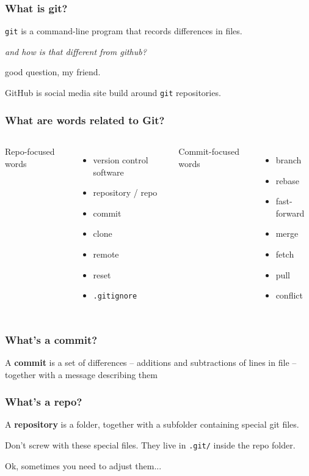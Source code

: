 \documentclass[14pt,aspectratio=1610]{beamer} %
\newcommand{\fframe}[2]{
   \begin{frame}
\frametitle{#1}
#2
\end{frame}
}
\begin{document}
\fframe{What is git?}
{
\begin{definition}
	{\tt git} is a command-line program that records differences in files.
\end{definition}
\vspace{\baselineskip}

	{\em and how is that different from github?}

\vspace{\baselineskip}
	good question, my friend.  
	\begin{definition}
	GitHub is social media site build around {\tt git} repositories.  
	\end{definition}
}


\fframe{What are words related to Git?}
{
	\begin{columns}[t]
	\column{2in}
	Repo-focused words
	\begin{itemize}
		\item version control software
		\item repository / repo
		\item commit
		\item clone
		\item remote
		\item reset
		\item {\tt .gitignore}


		
	\end{itemize}

	\column{2in}
	Commit-focused words
	\begin{itemize}		
		\item branch
		\item rebase
		\item fast-forward
		\item merge
		\item fetch
		\item pull
		\item conflict
	\end{itemize}
	\end{columns}
}





\fframe{What's a commit?}{

\begin{definition}
A {\bf commit} is a set of differences -- additions and subtractions of lines in file -- together with a message describing them
\end{definition}
}

\fframe{What's a repo?}
{  
\begin{definition}
A {\bf repository} is a folder, together with a subfolder containing special git files. 
\end{definition}

 Don't screw with these special files.  They live in {\tt .git/} inside the repo folder.  

\vfill 

 \tiny Ok, sometimes you need to adjust them...
}
                    
\end{document}
